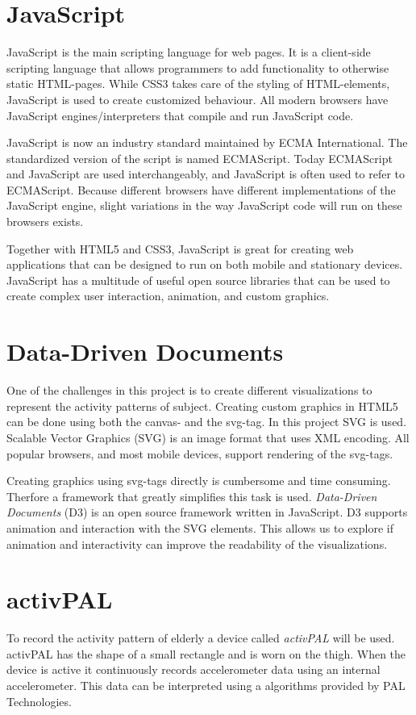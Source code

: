 \section{JavaScript}
JavaScript is the main scripting language for web pages. It is a client-side scripting language that allows programmers to add functionality to otherwise static HTML-pages. While CSS3 takes care of the styling of HTML-elements, JavaScript is used to create customized behaviour. All modern browsers have JavaScript engines/interpreters that compile and run JavaScript code.

JavaScript is now an industry standard maintained by ECMA International. The standardized version of the script is named ECMAScript. Today ECMAScript and JavaScript are used interchangeably, and JavaScript is often used to refer to ECMAScript. Because different browsers have different implementations of the JavaScript engine, slight variations in the way JavaScript code will run on these browsers exists.


Together with HTML5 and CSS3, JavaScript is great for creating web applications that can be designed to run on both mobile and stationary devices. JavaScript has a multitude of useful open source libraries that can be used to create complex user interaction, animation, and custom graphics.

\section{Data-Driven Documents}
One of the challenges in this project is to create different visualizations to represent the activity patterns of subject. Creating custom graphics in HTML5 can be done using both the canvas- and the svg-tag. In this project SVG is used. Scalable Vector Graphics (SVG) is an image format that uses XML encoding. All popular browsers, and most mobile devices, support rendering of the svg-tags.

Creating graphics using svg-tags directly is cumbersome and time consuming. Therfore a framework that greatly simplifies this task is used. \emph{Data-Driven Documents} (D3) is an open source framework written in JavaScript. D3 supports animation and interaction with the SVG elements. This allows us to explore if animation and interactivity can improve the readability of the visualizations.

\section{activPAL}
To record the activity pattern of elderly a device called \emph{activPAL} will be used. activPAL has the shape of a small rectangle and is worn on the thigh. When the device is active it continuously records accelerometer data using an internal accelerometer. This data can be interpreted using a algorithms provided by PAL Technologies.

